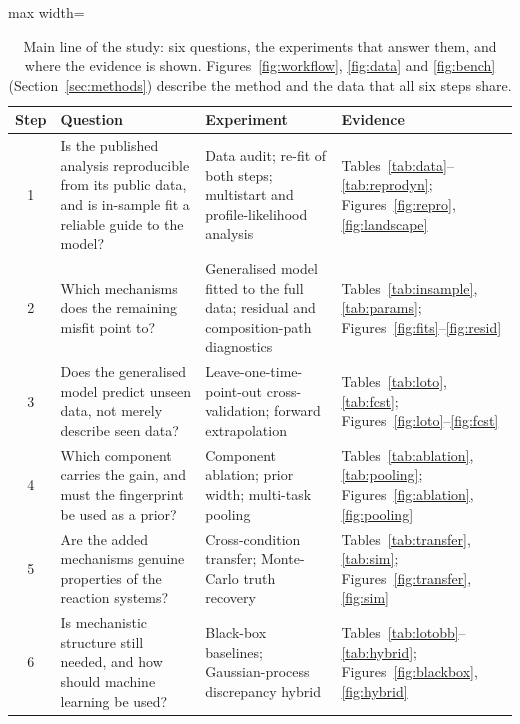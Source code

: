 \begin{table}[!htbp]
\centering\small
\caption{Main line of the study: six questions, the experiments that answer them, and where the evidence is shown. Figures~\ref{fig:workflow}, \ref{fig:data} and \ref{fig:bench} (Section~\ref{sec:methods}) describe the method and the data that all six steps share.}\label{tab:roadmap}
\begin{adjustbox}{max width=\linewidth}
\begin{tabular}{@{}c p{5.6cm} p{4.6cm} p{4.4cm}@{}}
\toprule
Step & Question & Experiment & Evidence \\
\midrule
1 & Is the published analysis reproducible from its public data, and is in-sample fit a reliable guide to the model? & Data audit; re-fit of both steps; multistart and profile-likelihood analysis & Tables~\ref{tab:data}--\ref{tab:reprodyn}; Figures~\ref{fig:repro}, \ref{fig:landscape} \\
2 & Which mechanisms does the remaining misfit point to? & Generalised model fitted to the full data; residual and composition-path diagnostics & Tables~\ref{tab:insample}, \ref{tab:params}; Figures~\ref{fig:fits}--\ref{fig:resid} \\
3 & Does the generalised model predict unseen data, not merely describe seen data? & Leave-one-time-point-out cross-validation; forward extrapolation & Tables~\ref{tab:loto}, \ref{tab:fcst}; Figures~\ref{fig:loto}--\ref{fig:fcst} \\
4 & Which component carries the gain, and must the fingerprint be used as a prior? & Component ablation; prior width; multi-task pooling & Tables~\ref{tab:ablation}, \ref{tab:pooling}; Figures~\ref{fig:ablation}, \ref{fig:pooling} \\
5 & Are the added mechanisms genuine properties of the reaction systems? & Cross-condition transfer; Monte-Carlo truth recovery & Tables~\ref{tab:transfer}, \ref{tab:sim}; Figures~\ref{fig:transfer}, \ref{fig:sim} \\
6 & Is mechanistic structure still needed, and how should machine learning be used? & Black-box baselines; Gaussian-process discrepancy hybrid & Tables~\ref{tab:lotobb}--\ref{tab:hybrid}; Figures~\ref{fig:blackbox}, \ref{fig:hybrid} \\
\bottomrule
\end{tabular}
\end{adjustbox}
\end{table}

